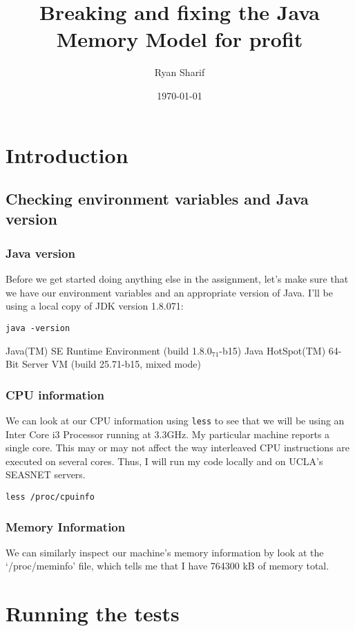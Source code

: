 \documentclass[11pt]{article}
\author{Ryan Sharif}
\date{\today}
\title{Breaking and fixing the Java Memory Model for profit}
\begin{document}
\maketitle
\tableofcontents


\section{Introduction}
\label{sec-1}
\subsection{Checking environment variables and Java version}
\label{sec-1-1}
\subsubsection{Java version}
\label{sec-1-1-1}
Before we get started doing anything else in the assignment,
let's make sure that we have our environment variables and
an appropriate version of Java. I'll be using a local copy
of JDK version 1.8.071:

\begin{verbatim}
java -version
\end{verbatim}
Java(TM) SE Runtime Environment (build 1.8.0$_{\text{71}}$-b15)
Java HotSpot(TM) 64-Bit Server VM (build 25.71-b15, mixed mode)
\subsubsection{CPU information}
\label{sec-1-1-2}
We can look at our CPU information using \verb~less~ to see that we will
be using an Inter Core i3 Processor running at 3.3GHz. My particular
machine reports a single core. This may or may not affect the way
interleaved CPU instructions are executed on several cores. Thus,
I will run my code locally and on UCLA's SEASNET servers. 

\begin{verbatim}
less /proc/cpuinfo
\end{verbatim}
\subsubsection{Memory Information}
\label{sec-1-1-3}
We can similarly inspect our machine's memory information by look at
the `/proc/meminfo' file, which tells me that I have 764300 kB of
memory total.
\section{Running the tests}
\label{sec-2}
\end{document}
